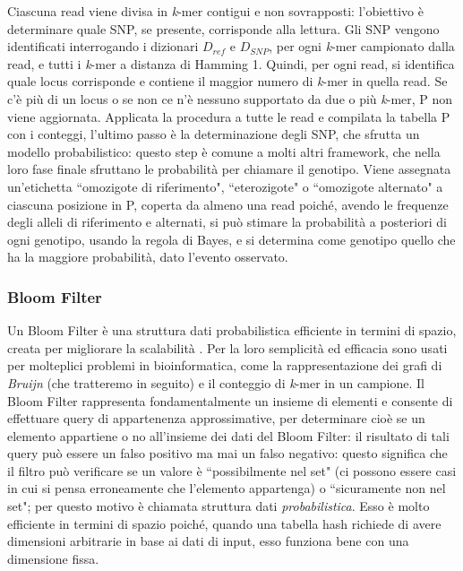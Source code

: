 \documentclass[../main.tex]{subfiles}
\begin{document}
Ciascuna read viene divisa in \textit{k}-mer contigui e non sovrapposti: l'obiettivo è determinare quale SNP, se presente, corrisponde alla lettura. Gli SNP vengono identificati interrogando i dizionari $D_{ref}$ e $D_{SNP}$, per ogni \textit{k}-mer campionato dalla read, e tutti i \textit{k}-mer a distanza di Hamming 1. Quindi, per ogni read, si identifica quale locus corrisponde e contiene il maggior numero di \textit{k}-mer in quella read. Se c'è più di un locus o se non ce n'è nessuno supportato da due o più \textit{k}-mer, P non viene aggiornata. Applicata la procedura a tutte le read e compilata la tabella P con i conteggi, l'ultimo passo è la determinazione degli SNP, che sfrutta un modello probabilistico: questo step è comune a molti altri framework, che nella loro fase finale sfruttano le probabilità per chiamare il genotipo. Viene assegnata un'etichetta ``omozigote di riferimento", ``eterozigote" o ``omozigote alternato" a ciascuna posizione in P, coperta da almeno una read poiché, avendo le frequenze degli alleli di riferimento e alternati, si può stimare la probabilità a posteriori di ogni genotipo, usando la regola di Bayes, e si determina come genotipo quello che ha la maggiore probabilità, dato l'evento osservato.


\subsubsection{Bloom Filter}
\label{BloomFilter}
Un Bloom Filter è una struttura dati probabilistica efficiente in termini di spazio, creata per migliorare la scalabilità \cite{sun-medvedev2018vargeno}. Per la loro semplicità ed efficacia sono usati per molteplici problemi in bioinformatica, come la rappresentazione dei grafi di \textit{Bruijn} (che tratteremo in seguito) e il conteggio di \textit{k}-mer in un campione. Il Bloom Filter rappresenta fondamentalmente un insieme di elementi e consente di effettuare query di appartenenza approssimative, per determinare cioè se un elemento appartiene o no all'insieme dei dati del Bloom Filter: il risultato di tali query può essere un falso positivo ma mai un falso negativo: questo significa che il filtro può verificare se un valore è ``possibilmente nel set" (ci possono essere casi in cui si pensa erroneamente che l'elemento appartenga) o ``sicuramente non nel set"; per questo motivo è chiamata struttura dati \textit{probabilistica}. Esso è molto efficiente in termini di spazio poiché, quando una tabella hash richiede di avere dimensioni arbitrarie in base ai dati di input, esso funziona bene con una dimensione fissa.
\end{document}
